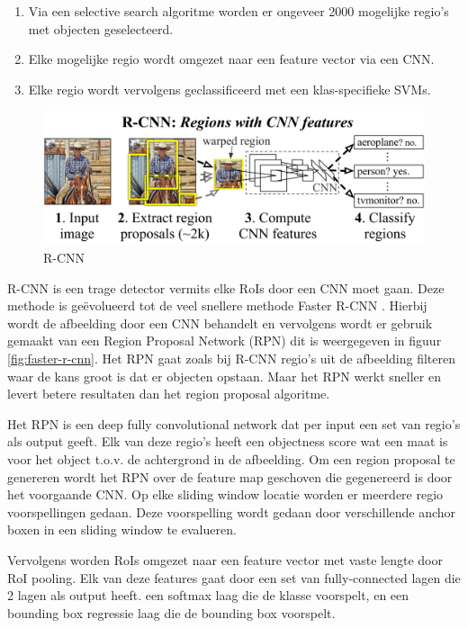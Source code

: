\begin{enumerate}
    \item Via een selective search algoritme \cite{uijlings_selective_2013} worden er ongeveer 2000 mogelijke regio's met objecten geselecteerd.
    \item Elke mogelijke regio wordt omgezet naar een feature vector via een CNN.
    \item Elke regio wordt vervolgens geclassificeerd met een klas-specifieke SVMs.
\end{enumerate}

\begin{figure}[!ht]
	\centering
	\includegraphics[width=0.70\linewidth]{fig/R-CNN.jpg}
	\caption{R-CNN}
	\label{fig:r-cnn}
\end{figure}

R-CNN is een trage detector vermits elke RoIs door een CNN moet gaan. 
Deze methode is ge\"evolueerd tot de veel snellere methode Faster R-CNN \cite{ren_faster_2016}. 
Hierbij wordt de afbeelding door een CNN behandelt en vervolgens wordt er gebruik gemaakt van een Region Proposal Network (RPN) dit is weergegeven in figuur \ref{fig:faster-r-cnn}. 
Het RPN gaat zoals bij R-CNN regio's uit de afbeelding filteren waar de kans groot is dat er objecten opstaan.
Maar het RPN werkt sneller en levert betere resultaten dan het region proposal algoritme. 

Het RPN is een deep fully convolutional network dat per input een set van regio's als output geeft.
Elk van deze regio's heeft een objectness score wat een maat is voor het object t.o.v. de achtergrond in de afbeelding.
Om een region proposal te genereren wordt het RPN over de feature map geschoven die gegenereerd is door het voorgaande CNN.
Op elke sliding window locatie worden er meerdere regio voorspellingen gedaan.
Deze voorspelling wordt gedaan door verschillende anchor boxen in een sliding window te evalueren.

Vervolgens worden RoIs omgezet naar een feature vector met vaste lengte door RoI pooling.
Elk van deze features gaat door een set van fully-connected lagen die 2 lagen als output heeft.
een softmax laag die de klasse voorspelt, en een bounding box regressie laag die de bounding box voorspelt.

